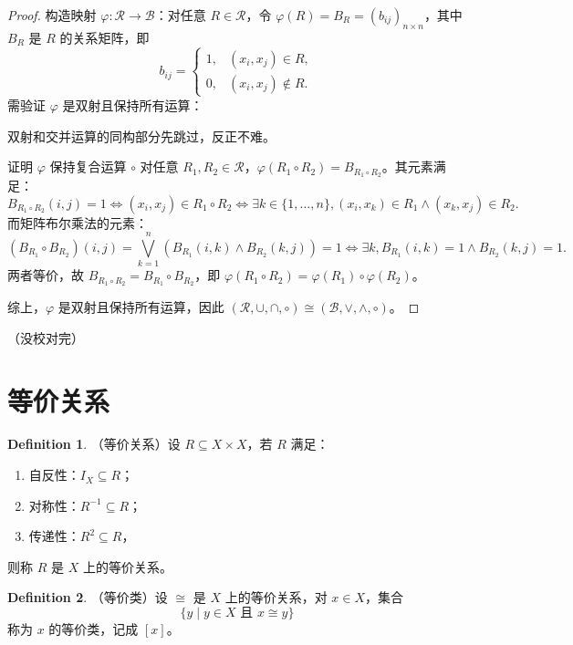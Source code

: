 \documentclass[oneside]{book}
\theoremstyle{definition}
\newtheorem{definition}{Definition}[section]
\begin{document}
\begin{proof}
	构造映射 \( \varphi: \mathcal{R} \to \mathcal{B} \)：对任意 \( R \in \mathcal{R} \)，令 \( \varphi(R) = B_R = (b_{ij})_{n \times n} \)，其中 \( B_R \) 是 \( R \) 的关系矩阵，即
	\[
	b_{ij} = \begin{cases} 1, & (x_i, x_j) \in R, \\ 0, & (x_i, x_j) \notin R. \end{cases}
	\]
	需验证 \( \varphi \) 是双射且保持所有运算：
	
	双射和交并运算的同构部分先跳过，反正不难。
	
	证明 \( \varphi \) 保持复合运算 \( \circ \)
	对任意 \( R_1, R_2 \in \mathcal{R} \)，\( \varphi(R_1 \circ R_2) = B_{R_1 \circ R_2} \)。其元素满足：
	\[
	B_{R_1 \circ R_2}(i,j) = 1 \iff (x_i, x_j) \in R_1 \circ R_2 \iff \exists k \in \{1,\dots,n\}, (x_i, x_k) \in R_1 \land (x_k, x_j) \in R_2.
	\]
	而矩阵布尔乘法的元素：
	\[
	(B_{R_1} \circ B_{R_2})(i,j) = \bigvee_{k=1}^n (B_{R_1}(i,k) \wedge B_{R_2}(k,j)) = 1 \iff \exists k, B_{R_1}(i,k)=1 \land B_{R_2}(k,j)=1.
	\]
	两者等价，故 \( B_{R_1 \circ R_2} = B_{R_1} \circ B_{R_2} \)，即 \( \varphi(R_1 \circ R_2) = \varphi(R_1) \circ \varphi(R_2) \)。
	
	
	综上，\( \varphi \) 是双射且保持所有运算，因此 \( (\mathcal{R}, \cup, \cap, \circ) \cong (\mathcal{B}, \vee, \wedge, \circ) \)。
\end{proof}
（没校对完）

\section{等价关系}

\begin{definition}
	（等价关系）设 \( R \subseteq X \times X \)，若 \( R \) 满足：
	\begin{enumerate}
		\item 自反性：\( I_X \subseteq R \)；
		\item 对称性：\( R^{-1} \subseteq R \)；
		\item 传递性：\( R^2 \subseteq R \)，
	\end{enumerate}
	则称 \( R \) 是 \( X \) 上的等价关系。
\end{definition}

\begin{definition}
	（等价类）设 \( \cong \) 是 \( X \) 上的等价关系，对 \( x \in X \)，集合
	\[
	\{ y \mid y \in X \text{ 且 } x \cong y \}
	\]
	称为 \( x \) 的等价类，记成 \([x]\)。
\end{definition}
\end{document}
